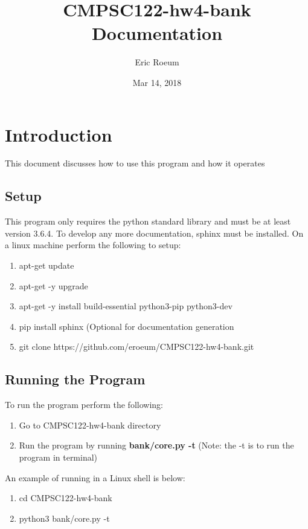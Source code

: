 \documentclass[letterpaper,10pt,english]{sphinxmanual}
\title{CMPSC122-hw4-bank Documentation}
\date{Mar 14, 2018}
\author{Eric Roeum}
\begin{document}
\maketitle
\sphinxtableofcontents
{}\label{\detokenize{index::doc}}

\section{Introduction}
\label{\detokenize{intro:intro}}\label{\detokenize{intro::doc}}
This document discusses how to use this program and how it operates

\subsection{Setup}
\label{\detokenize{intro:setup}}\label{\detokenize{intro::doc}}
This program only requires the python standard library and must be at least version 3.6.4.  To develop any more documentation, sphinx must be installed.  On a linux machine perform the following to setup:
\begin{enumerate}
\item{apt-get update}
\item{apt-get -y upgrade}
\item{apt-get -y install build-essential python3-pip python3-dev}
\item{pip install sphinx (Optional for documentation generation}
\item{git clone https://github.com/eroeum/CMPSC122-hw4-bank.git}
\end{enumerate}

\subsection{Running the Program}
\label{\detokenize{intro:running}}\label{\detokenize{intro::doc}}
To run the program perform the following:
\begin{enumerate}
\item{Go to CMPSC122-hw4-bank directory}
\item{Run the program by running \textbf{bank/core.py -t} (Note: the -t is to run the program in terminal)}
\end{enumerate}
An example of running in a Linux shell is below:
\begin{enumerate}
\item{cd CMPSC122-hw4-bank}
\item{python3 bank/core.py -t}
\end{enumerate}
\end{document}
